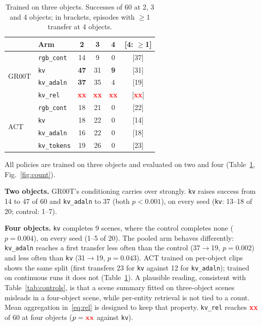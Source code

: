 \documentclass[letterpaper, 10pt, journal, twoside]{IEEEtran}
\newcommand{\tbd}[1][]{\textcolor{red}{\textbf{xx}#1}}
\newcommand{\arm}[1]{\texttt{#1}}
\begin{document}
\begin{table}[t]
\centering
\caption{Trained on three objects. Successes of 60 at 2, 3 and 4 objects;
in brackets, episodes with $\geq$1 transfer at 4 objects.}
\label{tab:rq3}
\footnotesize
\setlength{\tabcolsep}{4pt}
\begin{tabular}{@{}llcccc@{}}
\toprule
& Arm & 2 & 3 & 4 & [4: $\geq$1] \\
\midrule
\multirow{4}{*}{GR00T}
 & \arm{rgb\_cont} & 14 & 9  & 0 & [37] \\
 & \arm{kv}        & \textbf{47} & 31 & \textbf{9} & [31] \\
 & \arm{kv\_adaln} & \textbf{37} & 35 & 4 & [19] \\
 & \arm{kv\_rel}   & \tbd & \tbd & \tbd & [\tbd] \\
\midrule
\multirow{4}{*}{ACT}
 & \arm{rgb\_cont}  & 18 & 21 & 0 & [22] \\
 & \arm{kv}         & 18 & 22 & 0 & [14] \\
 & \arm{kv\_adaln}  & 16 & 22 & 0 & [18] \\
 & \arm{kv\_tokens} & 19 & 26 & 0 & [23] \\
\bottomrule
\end{tabular}
\end{table}

All policies are trained on three objects and evaluated on two and four
(Table~\ref{tab:rq3}, Fig.~\ref{fig:count}).

\textbf{Two objects.} GR00T's conditioning carries over strongly.
\arm{kv} raises success from 14 to 47 of 60 and \arm{kv\_adaln} to 37 (both
$p<0.001$), on every seed (\arm{kv}: 13--18 of 20; control: 1--7).

\textbf{Four objects.} \arm{kv} completes 9 scenes, where the control
completes none ($p=0.004$), on every seed (1--5 of 20). The pooled arm
behaves differently: \arm{kv\_adaln} reaches a first transfer less often
than the control (37$\rightarrow$19, $p=0.002$) and less often than \arm{kv}
(31$\rightarrow$19, $p=0.043$). ACT trained on per-object clips shows the same split
(first transfers 23 for \arm{kv} against 12 for \arm{kv\_adaln}); trained on
continuous runs it does not (Table~\ref{tab:rq3}). A plausible reading, consistent with
Table~\ref{tab:controls}, is that a scene summary fitted on three-object
scenes misleads in a four-object scene, while per-entity retrieval is not
tied to a count. Mean aggregation in~\eqref{eq:rel} is designed to keep that
property. \arm{kv\_rel} reaches \tbd{} of 60 at four objects ($p=\tbd$
against \arm{kv}).
\end{document}
